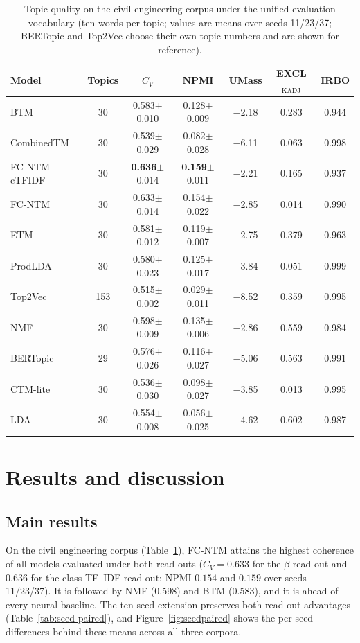 \documentclass[pdflatex,sn-basic]{sn-jnl}
\newcommand{\fcntm}{FC-NTM}
\begin{document}
\begin{table}[!t]
\centering
\caption{Topic quality on the civil engineering corpus under the unified evaluation vocabulary
(ten words per topic; values are means over seeds 11/23/37; BERTopic and Top2Vec choose their
own topic numbers and are shown for reference).}
\label{tab:civil}
\small
\begin{tabular}{lcccccc}
\toprule
Model & Topics & $C_V$ & NPMI & UMass & EXCL$_{\mathrm{KADJ}}$ & IRBO \\
\midrule
BTM & 30 & 0.583$\pm$0.010 & 0.128$\pm$0.009 & $-$2.18 & 0.283 & 0.944 \\
CombinedTM & 30 & 0.539$\pm$0.029 & 0.082$\pm$0.028 & $-$6.11 & 0.063 & 0.998 \\
\fcntm{}-cTFIDF & 30 & \textbf{0.636}$\pm$0.014 & \textbf{0.159}$\pm$0.011 & $-$2.21 & 0.165 & 0.937 \\
\fcntm{} & 30 & 0.633$\pm$0.014 & 0.154$\pm$0.022 & $-$2.85 & 0.014 & 0.990 \\
ETM & 30 & 0.581$\pm$0.012 & 0.119$\pm$0.007 & $-$2.75 & 0.379 & 0.963 \\
ProdLDA & 30 & 0.580$\pm$0.023 & 0.125$\pm$0.017 & $-$3.84 & 0.051 & 0.999 \\
Top2Vec & 153 & 0.515$\pm$0.002 & 0.029$\pm$0.011 & $-$8.52 & 0.359 & 0.995 \\
NMF & 30 & 0.598$\pm$0.009 & 0.135$\pm$0.006 & $-$2.86 & 0.559 & 0.984 \\
BERTopic & 29 & 0.576$\pm$0.026 & 0.116$\pm$0.027 & $-$5.06 & 0.563 & 0.991 \\
CTM-lite & 30 & 0.536$\pm$0.030 & 0.098$\pm$0.027 & $-$3.85 & 0.013 & 0.995 \\
LDA & 30 & 0.554$\pm$0.008 & 0.056$\pm$0.025 & $-$4.62 & 0.602 & 0.987 \\
\bottomrule
\end{tabular}
\end{table}

\section{Results and discussion}
\label{sec:results}

\subsection{Main results}
On the civil engineering corpus (Table~\ref{tab:civil}), \fcntm{} attains the highest coherence
of all models evaluated under both read-outs ($C_V=0.633$ for the $\beta$ read-out and $0.636$
for the class TF--IDF read-out; NPMI $0.154$ and $0.159$ over seeds 11/23/37). It is followed by
NMF (0.598) and BTM (0.583), and it is ahead of every neural baseline. The ten-seed extension
preserves both read-out advantages (Table~\ref{tab:seed-paired}), and Figure~\ref{fig:seedpaired}
shows the per-seed differences behind these means across all three corpora.
\end{document}
